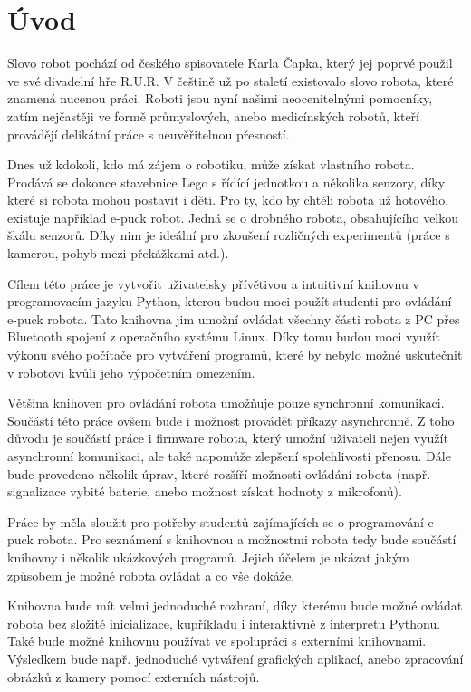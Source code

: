 \chapter*{Úvod}

Slovo robot pochází od českého spisovatele Karla Čapka, který jej poprvé
použil ve své divadelní hře R.U.R. V češtině už po staletí existovalo slovo
robota, které znamená nucenou práci. Roboti jsou nyní našimi neocenitelnými
pomocníky, zatím nejčastěji ve formě průmyslových, anebo medicínských robotů,
kteří provádějí delikátní práce s neuvěřitelnou přesností.

Dnes už kdokoli, kdo má zájem o robotiku, může získat vlastního robota.
Prodává se dokonce stavebnice Lego s řídící jednotkou a několika senzory,
díky které si robota mohou postavit i děti. Pro ty, kdo by chtěli robota už
hotového, existuje například e-puck robot. Jedná se o drobného robota,
obsahujícího velkou škálu senzorů. Díky nim je ideální pro zkoušení
rozličných experimentů (práce s kamerou, pohyb mezi překážkami atd.).

Cílem této práce je vytvořit uživatelsky přívětivou a intuitivní knihovnu v
programovacím jazyku Python, kterou budou moci použít studenti pro ovládání
e-puck robota. Tato knihovna jim umožní ovládat všechny části robota z PC
přes Bluetooth spojení z operačního systému Linux. Díky tomu budou moci
využít výkonu svého počítače pro vytváření programů, které by nebylo možné
uskutečnit v robotovi kvůli jeho výpočetním omezením.

Většina knihoven pro ovládání robota umožňuje pouze synchronní komunikaci.
Součástí této práce ovšem bude i možnost provádět příkazy asynchronně. Z
toho důvodu je součástí práce i firmware robota, který umožní uživateli
nejen využít asynchronní komunikaci, ale také napomůže zlepšení spolehlivosti
přenosu. Dále bude provedeno několik úprav, které rozšíří možnosti ovládání
robota (např. signalizace vybité baterie, anebo možnost získat hodnoty z
mikrofonů).

Práce by měla sloužit pro potřeby studentů zajímajících se o programování
e-puck robota. Pro seznámení s knihovnou a možnostmi robota tedy bude součástí
knihovny i několik ukázkových programů. Jejich účelem je ukázat jakým způsobem
je možné robota ovládat a co vše dokáže.

Knihovna bude mít velmi jednoduché rozhraní, díky kterému bude možné
ovládat robota bez složité inicializace, kupříkladu i interaktivně z
interpretu Pythonu. Také bude možné knihovnu používat ve spolupráci s
externími knihovnami. Výsledkem bude např. jednoduché vytváření grafických
aplikací, anebo zpracování obrázků z kamery pomocí externích nástrojů.

